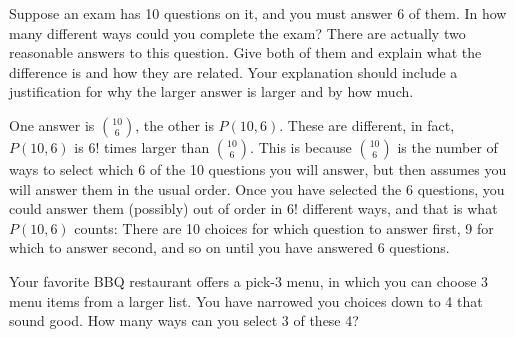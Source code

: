 \begin{questions}
\question Suppose an exam has 10 questions on it, and you must answer 6 of them.  In how many different ways could you complete the exam?  There are actually two reasonable answers to this question.  Give both of them and explain what the difference is and how they are related.  Your explanation should include a justification for why the larger answer is larger and by how much.

	\begin{answer}
		 One answer is ${10 \choose 6}$, the other is $P(10, 6)$.  These are different, in fact, $P(10,6)$ is $6!$ times larger than ${10 \choose 6}$.  This is because ${10 \choose 6}$ is the number of ways to select which 6 of the 10 questions you will answer, but then assumes you will answer them in the usual order.  Once you have selected the 6 questions, you could answer them (possibly) out of order in 6! different ways, and that is what $P(10,6)$ counts: There are 10 choices for which question to answer first, 9 for which to answer second, and so on until you have answered 6 questions.
	\end{answer}



\question Your favorite BBQ restaurant offers a pick-3 menu, in which you can choose 3 menu items from a larger list.  You have narrowed you choices down to 4 that sound good.  How many ways can you select 3 of these 4?


\begin{answer}
  \begin{parts}

\end{parts}
\end{answer}
\end{questions}
